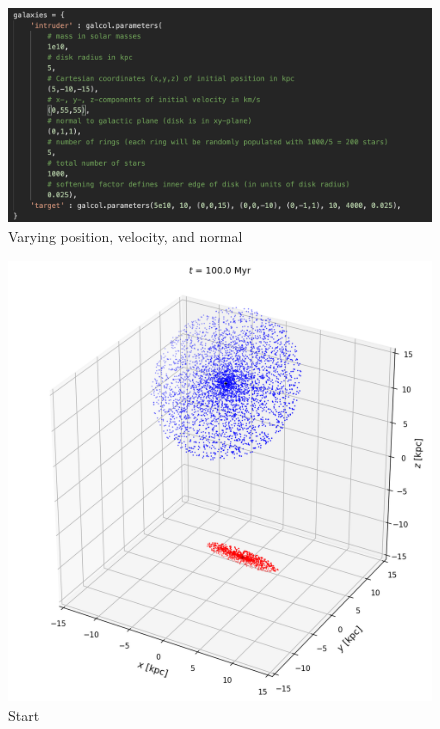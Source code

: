 \documentclass[linenumbers,RNAAS,trackchanges]{aastex631}
\begin{document}
\begin{figure}[H]
    \centering
    \includegraphics[scale=.60]{comparison_galaxy/ARP_70_vars.png}
    \caption{Varying position, velocity, and normal}
    \label{fig:code}
\end{figure}
\newpage
\begin{figure}[H]
    \centering
    \includegraphics[scale=.40]{comparison_galaxy/ARP_70_input.png}
    \caption{Start}
    \label{fig:code}
\end{figure}
\end{document}
